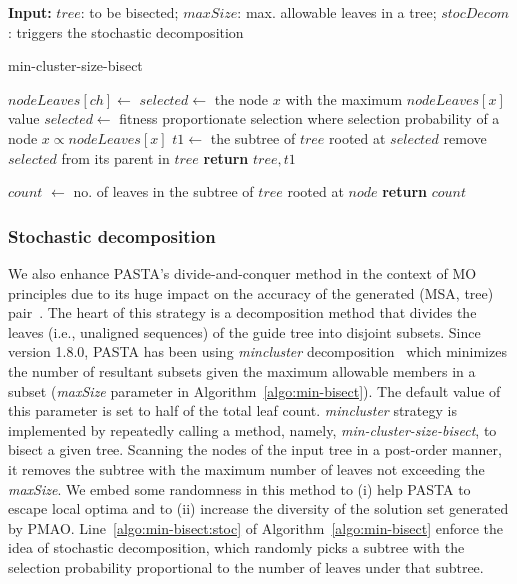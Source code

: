 \begin{algorithm}[!htbp]%
	\textbf{Input:} $tree$: to be bisected; $maxSize$: max. allowable leaves in a tree; $stocDecom$: triggers the stochastic decomposition
\begin{algorithmic}[1]
		\caption{min-cluster-size-bisect}
		\label{algo:min-bisect}
		\State $nodeLeaves[ch] \gets $ 
		\EndFor
		\State $selected \gets$ the node $x$ with the maximum $nodeLeaves[x]$ value
		\Else
		\State $selected \gets $ fitness proportionate selection where selection probability of a node $x \propto nodeLeaves[x]$  \label{algo:min-bisect:stoc}
		\EndIf
		\EndIf
		\State $t1 \gets $ the subtree of $tree$ rooted at $selected$
		\State remove $selected$ from its parent in $tree$
		\EndFor
		\State \textbf{return} $tree, t1$
		\Statex

		\State $ count $ $\gets$ no. of leaves in the subtree of $tree$ rooted at $node$
		\State \textbf{return} $ count $
		\EndFunction
	\end{algorithmic}
\end{algorithm}

\subsubsection{Stochastic decomposition}\label{subsec:stocastic}
We also enhance PASTA's divide-and-conquer method in the context of MO principles due to its huge impact on the accuracy of the generated (MSA, tree) pair~\cite{liu2012sate}. The heart of this strategy is a decomposition method that divides the leaves (i.e., unaligned sequences) of the guide tree into disjoint subsets. Since version 1.8.0, PASTA has been using \textit{mincluster} decomposition~\cite{balaban2019treecluster} which minimizes the number of resultant subsets given the maximum allowable members in a subset (\textit{maxSize} parameter in Algorithm~\ref{algo:min-bisect}). The default value of this parameter is set to half of the total leaf count. \textit{mincluster} strategy is implemented by repeatedly calling a method, namely, \textit{min-cluster-size-bisect}, to bisect a given tree. Scanning the nodes of the input tree in a post-order manner, it removes the subtree with the maximum number of leaves not exceeding the \textit{maxSize}. We embed some randomness in this method to (i) help PASTA to escape local optima and to (ii) increase the diversity of the solution set generated by PMAO. Line~\ref{algo:min-bisect:stoc} of Algorithm~\ref{algo:min-bisect} enforce the idea of stochastic decomposition, which randomly picks a subtree with the selection probability proportional to the number of leaves under that subtree.

